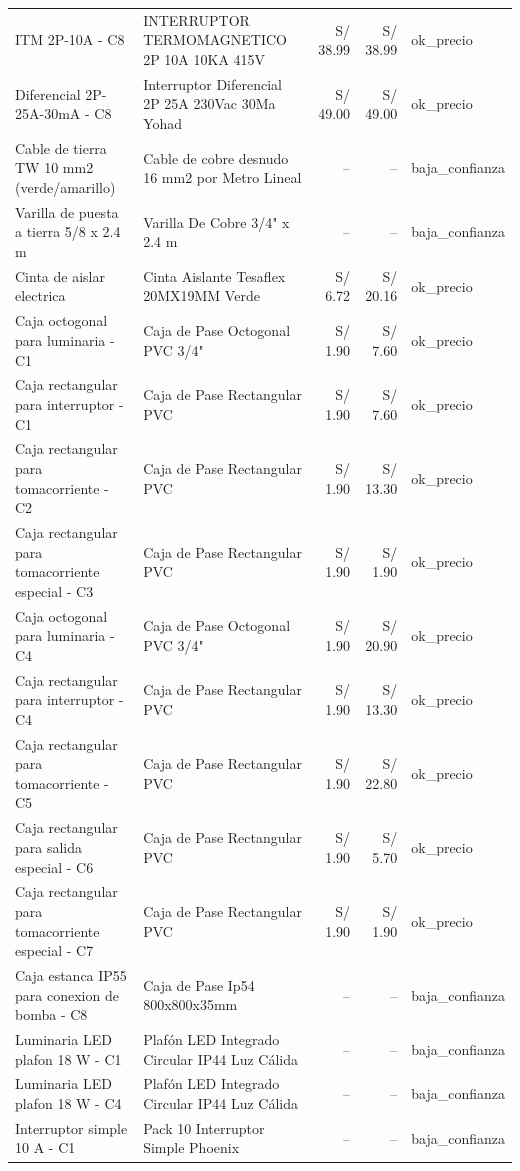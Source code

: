 \documentclass[11pt,a4paper]{article}
\begin{document}
\begin{longtable}{p{} p{} r r p{}}
ITM 2P-10A - C8 & INTERRUPTOR TERMOMAGNETICO 2P 10A 10KA 415V & S/ 38.99 & S/ 38.99 & ok\_precio \\
Diferencial 2P-25A-30mA - C8 & Interruptor Diferencial 2P 25A 230Vac 30Ma Yohad & S/ 49.00 & S/ 49.00 & ok\_precio \\
Cable de tierra TW 10 mm2 (verde/amarillo) & Cable de cobre desnudo 16 mm2 por Metro Lineal & -- & -- & baja\_confianza \\
Varilla de puesta a tierra 5/8 x 2.4 m & Varilla De Cobre 3/4" x 2.4 m & -- & -- & baja\_confianza \\
Cinta de aislar electrica & Cinta Aislante Tesaflex 20MX19MM Verde & S/ 6.72 & S/ 20.16 & ok\_precio \\
Caja octogonal para luminaria - C1 & Caja de Pase Octogonal PVC 3/4" & S/ 1.90 & S/ 7.60 & ok\_precio \\
Caja rectangular para interruptor - C1 & Caja de Pase Rectangular PVC & S/ 1.90 & S/ 7.60 & ok\_precio \\
Caja rectangular para tomacorriente - C2 & Caja de Pase Rectangular PVC & S/ 1.90 & S/ 13.30 & ok\_precio \\
Caja rectangular para tomacorriente especial - C3 & Caja de Pase Rectangular PVC & S/ 1.90 & S/ 1.90 & ok\_precio \\
Caja octogonal para luminaria - C4 & Caja de Pase Octogonal PVC 3/4" & S/ 1.90 & S/ 20.90 & ok\_precio \\
Caja rectangular para interruptor - C4 & Caja de Pase Rectangular PVC & S/ 1.90 & S/ 13.30 & ok\_precio \\
Caja rectangular para tomacorriente - C5 & Caja de Pase Rectangular PVC & S/ 1.90 & S/ 22.80 & ok\_precio \\
Caja rectangular para salida especial - C6 & Caja de Pase Rectangular PVC & S/ 1.90 & S/ 5.70 & ok\_precio \\
Caja rectangular para tomacorriente especial - C7 & Caja de Pase Rectangular PVC & S/ 1.90 & S/ 1.90 & ok\_precio \\
Caja estanca IP55 para conexion de bomba - C8 & Caja de Pase Ip54 800x800x35mm & -- & -- & baja\_confianza \\
Luminaria LED plafon 18 W - C1 & Plafón LED Integrado Circular IP44 Luz Cálida & -- & -- & baja\_confianza \\
Luminaria LED plafon 18 W - C4 & Plafón LED Integrado Circular IP44 Luz Cálida & -- & -- & baja\_confianza \\
Interruptor simple 10 A - C1 & Pack 10 Interruptor Simple Phoenix & -- & -- & baja\_confianza \\

\end{longtable}
\end{document}
